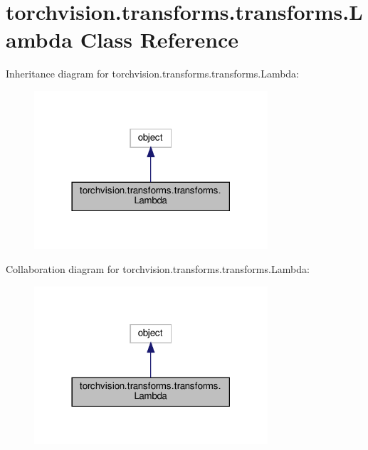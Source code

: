 \hypertarget{classtorchvision_1_1transforms_1_1transforms_1_1Lambda}{}\section{torchvision.\+transforms.\+transforms.\+Lambda Class Reference}
\label{classtorchvision_1_1transforms_1_1transforms_1_1Lambda}


Inheritance diagram for torchvision.\+transforms.\+transforms.\+Lambda\+:
\nopagebreak
\begin{figure}[H]
\begin{center}
\leavevmode
\includegraphics[width=246pt]{classtorchvision_1_1transforms_1_1transforms_1_1Lambda__inherit__graph}
\end{center}
\end{figure}


Collaboration diagram for torchvision.\+transforms.\+transforms.\+Lambda\+:
\nopagebreak
\begin{figure}[H]
\begin{center}
\leavevmode
\includegraphics[width=246pt]{classtorchvision_1_1transforms_1_1transforms_1_1Lambda__coll__graph}
\end{center}
\end{figure}
